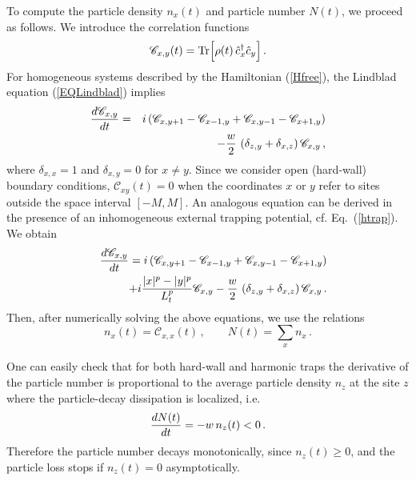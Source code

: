   To compute the particle density $n_x(t)$ and particle number $N(t)$,
  we proceed as follows.  We introduce the correlation functions
  \begin{eqnarray}
    {\mathscr C}_{x,y}(t)= {\rm Tr}\Bigr[ \rho(t) \, \hat c_x^\dagger
      \hat c_y \Bigr] \,.
  \label{defct}
  \end{eqnarray}
  For homogeneous systems described by the Hamiltonian (\ref{Hfree}),
  the Lindblad equation (\ref{EQLindblad}) 
  implies
  \begin{eqnarray}
    {d\mathscr{C}_{x,y}\over dt} &=& i\,( \mathscr{C}_{x,y+1} -
     \mathscr{C}_{x-1,y} + \mathscr{C}_{x,y-1} - \mathscr{C}_{x+1,y} )
        \nonumber\\
      &&- \frac{w}{2} \ ( \delta _{z,y} + 
     \delta _{x, z} ) \, \mathscr{C}_{x,y} \,,
     \label{eqscxy}
  \end{eqnarray}
  where $\delta_{x,x}=1$ and $\delta_{x,y}=0$ for $x\neq y$.  Since we
  consider open (hard-wall) boundary conditions, ${\mathscr
    C}_{xy}(t)=0$ when the coordinates $x$ or $y$ refer to sites outside
  the space interval $[-M,M]$.  An analogous equation can be derived in
  the presence of an inhomogeneous external trapping potential,
  cf. Eq.~(\ref{htrap}).  We obtain
  \begin{eqnarray}
    &&  
    {d\mathscr{C}_{x,y}\over dt} = i\,( \mathscr{C}_{x,y+1} -
     \mathscr{C}_{x-1,y} + \mathscr{C}_{x,y-1} - \mathscr{C}_{x+1,y} )
     \nonumber\\
  &&\;\; + i {|x|^p - |y|^p\over L_t^p} \mathscr{C}_{x,y} 
  - \frac{w}{2} \ ( \delta _{z,y} + 
     \delta _{x, z} ) \, \mathscr{C}_{x,y} \,.
     \label{eqscxytrap}
  \end{eqnarray}
  Then, after numerically solving the above equations, we use the
  relations
  \begin{equation}
  n_x(t)=\mathscr{C}_{x,x}(t) \,,\qquad   N(t) = \sum _x n_x\,.
  \label{ntcxy}
  \end{equation}
  
  One can easily check that for both hard-wall and harmonic traps the
  derivative of the particle number is proportional to the average
  particle density $n_z$ at the site $z$ where the particle-decay
  dissipation is localized, i.e.
  \begin{equation}
    {d N(t)\over dt} = - w \, n_z(t) < 0\,.
  \label{ntnz}
  \end{equation}
  Therefore the particle number decays monotonically, since $n_z(t)\ge
  0$, and the particle loss stops if $n_z(t)= 0$ asymptotically.
  
